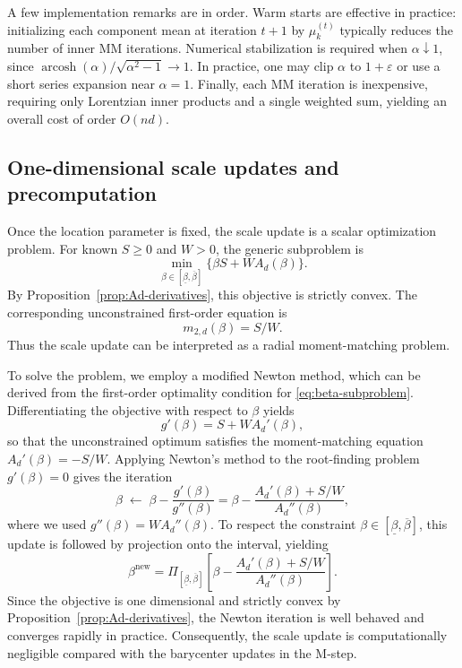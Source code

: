 \documentclass[11pt]{article}
\begin{document}
A few implementation remarks are in order. Warm starts are effective in practice: initializing each component mean at iteration \(t+1\) by \(\mu_k^{(t)}\) typically reduces the number of inner MM iterations. Numerical stabilization is required when \(\alpha\downarrow 1\), since \(\operatorname{arcosh}(\alpha)/\sqrt{\alpha^2-1}\to 1\). In practice, one may clip \(\alpha\) to \(1+\varepsilon\) or use a short series expansion near \(\alpha=1\). Finally, each MM iteration is inexpensive, requiring only Lorentzian inner products and a single weighted sum, yielding an overall cost of order \(O(nd)\).

\subsection{One-dimensional scale updates and precomputation}\label{subsec:scale-computation}

Once the location parameter is fixed, the scale update is a scalar optimization problem. For known \(S\ge 0\) and \(W>0\), the generic subproblem is
\begin{equation}\label{eq:beta-subproblem}
\min_{\beta\in[\underline{\beta},\overline{\beta}]}
\Big\{
\beta S+W A_d(\beta)
\Big\}.
\end{equation}
By Proposition~\ref{prop:Ad-derivatives}, this objective is strictly convex. The corresponding unconstrained first-order equation is
\begin{equation*}
m_{2,d}(\beta)=S/W.
\end{equation*}
Thus the scale update can be interpreted as a radial moment-matching problem.

To solve the problem, we employ a modified Newton method, which can be derived from the first-order optimality condition for \eqref{eq:beta-subproblem}. Differentiating the objective with respect to \(\beta\) yields
\[
g'(\beta)=S+W A_d'(\beta),
\]
so that the unconstrained optimum satisfies the moment-matching equation \(A_d'(\beta)=-S/W\). Applying Newton's method to the root-finding problem \(g'(\beta)=0\) gives the iteration
\[
\beta \;\leftarrow\; \beta-\frac{g'(\beta)}{g''(\beta)}
=
\beta-\frac{A_d'(\beta)+S/W}{A_d''(\beta)},
\]
where we used \(g''(\beta)=W A_d''(\beta)\). To respect the constraint \(\beta\in[\underline{\beta},\overline{\beta}]\), this update is followed by projection onto the interval, yielding
\begin{equation}\label{eq:newton-beta}
\beta^{\mathrm{new}}
=
\Pi_{[\underline{\beta},\overline{\beta}]}
\left[
\beta-\frac{A_d'(\beta)+S/W}{A_d''(\beta)}
\right].
\end{equation}
Since the objective is one dimensional and strictly convex by Proposition~\ref{prop:Ad-derivatives}, the Newton iteration is well behaved and converges rapidly in practice. Consequently, the scale update is computationally negligible compared with the barycenter updates in the M-step.
\end{document}
